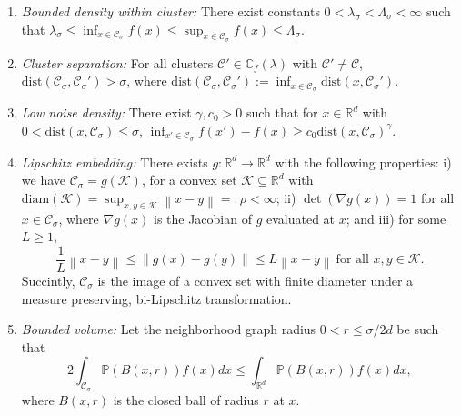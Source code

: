\documentclass{article}
\newcommand{\diam}{\rho}
\newcommand{\Reals}{\mathbb{R}}
\newcommand{\Rd}{\Reals^d}
\newcommand{\norm}[1]{\left\lVert#1\right\rVert}
\newcommand{\1}{\mathbf{1}}
\newcommand{\dist}{\mathrm{dist}}
\newcommand{\Pbb}{\mathbb{P}}
\newcommand{\Cbb}{\mathbb{C}}
\newcommand{\Cset}{\mathcal{C}}
\newcommand{\Csig}{\Cset_{\sigma}}
\theoremstyle{aldenthm}
\theoremstyle{aldenrmrk}
\begin{document}
\begin{enumerate}[label=(A\arabic*)]
\item
  \label{asmp: bounded_density}
  \emph{Bounded density within cluster:} There exist constants
  $0<\lambda_{\sigma}< \Lambda_{\sigma}<\infty$ such that 
  $\lambda_{\sigma} \leq \inf_{x \in \Csig} f(x) \leq \sup_{x \in \Csig} f(x)
  \leq \Lambda_{\sigma}$. 
  
\item
  \label{asmp: cluster_separation}
  \emph{Cluster separation:}
  For all clusters $\Cset' \in \Cbb_f(\lambda)$ with $\Cset' \not= \Cset$, 
  $\dist(\Csig,\Csig') > \sigma$, where $\dist(\Csig,\Csig') := \inf_{x
    \in \Csig} \dist(x,\Csig')$.  
    
\item 
  \label{asmp: low_noise_density}
  \emph{Low noise density:} There exist $\gamma,c_0 > 0$ such that for 
  $x \in \Rd$ with $0 < \dist(x, \Csig) \leq \sigma$,   
  $\inf_{x' \in \Csig} f(x') - f(x) \geq  c_0 \dist(x, \Csig)^{\gamma}$.
	
\item
  \label{asmp: embedding}
  \emph{Lipschitz embedding:}
  There exists $g: \Reals^d \to \Reals^d$ with the following properties: i)
  we have $\Csig = g(\mathcal{K})$, for a convex set $\mathcal{K} \subseteq \Rd$
  with $\mathrm{diam}(\mathcal{K}) = \sup_{x,y \in \mathcal{K}}\norm{x - y} =:
  \diam < \infty$; ii) $\det(\nabla g (x)) = 1$ for all $x \in \Csig$, where
  $\nabla g(x)$ is the Jacobian of $g$ evaluated at $x$; and iii) for some $L
  \geq 1$,   
  \begin{equation*}
    \frac{1}{L}\norm{x - y} \leq \norm{g(x) - g(y)} \leq L \norm{x - y} ~
    \text{for all $x,y \in \mathcal{K}$}. 
  \end{equation*}
  Succintly, $\Csig$ is the image of a convex set with finite diameter 
  under a  measure preserving, bi-Lipschitz transformation. 

\item
  \label{asmp: bounded_volume}
  \emph{Bounded volume:}
  Let the neighborhood graph radius $0 < r \leq \sigma/2d$ be such that
  \begin{equation*}
    2 \int_{\Csig} \Pbb(B(x,r)) f(x) dx \leq \int_{\Rd} \Pbb(B(x,r)) f(x) dx,
  \end{equation*}
  where $B(x,r)$ is the closed ball of radius $r$ at $x$.
\end{enumerate}
\end{document}
